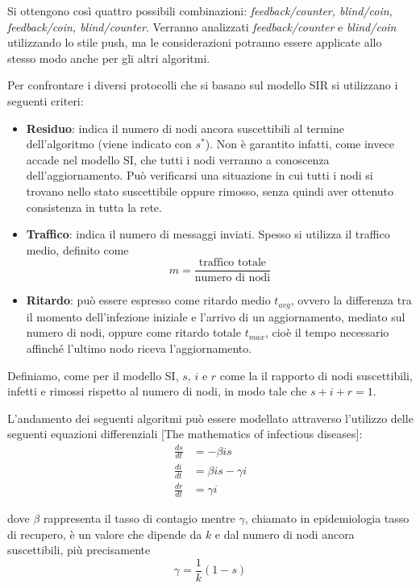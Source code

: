 Si ottengono così quattro possibili combinazioni: \textit{
feedback/counter, blind/coin, feedback/coin, blind/counter}.
Verranno analizzati \textit{feedback/counter} e \textit{blind/coin} utilizzando lo stile push, ma le considerazioni potranno essere applicate allo stesso modo anche per gli altri algoritmi.

Per confrontare i diversi protocolli che si basano sul modello SIR si utilizzano i seguenti criteri:
\begin{itemize}
    \item \textbf{Residuo}: indica il numero di nodi ancora suscettibili al termine dell’algoritmo (viene indicato con $s^*$). Non è garantito infatti, come invece accade nel modello SI, che tutti i nodi verranno a conoscenza dell’aggiornamento. Può verificarsi una situazione in cui tutti i nodi si trovano nello stato suscettibile oppure rimosso, senza quindi aver ottenuto consistenza in tutta la rete.
    \item \textbf{Traffico}: indica il numero di messaggi inviati. Spesso si utilizza il traffico medio, definito come
    \begin{equation}
        m = \frac{\textrm{traffico totale}}{\textrm{numero di nodi}}        
    \end{equation}
    \item \textbf{Ritardo}: può essere espresso come ritardo medio $t_{avg}$, ovvero la differenza tra il momento dell'infezione iniziale e l'arrivo di un aggiornamento, mediato sul numero di nodi, oppure come ritardo totale $t_{max}$, cioè il tempo necessario affinché l'ultimo nodo riceva l'aggiornamento.
\end{itemize}  
Definiamo, come per il modello SI, $s$, $i$ e $r$ come la il rapporto di nodi suscettibili, infetti e rimossi rispetto al numero di nodi, in modo tale che $s + i + r = 1$.

L’andamento dei seguenti algoritmi può essere modellato attraverso l’utilizzo delle seguenti equazioni differenziali [The mathematics of infectious diseases]:
\begin{equation}
    \begin{split}
        \frac{ds}{dt} & = - \beta is \\
    \frac{di}{dt} & = \beta is - \gamma i \\
    \frac{dr}{dt} & = \gamma i
    \end{split}
\end{equation}

dove $\beta$ rappresenta il tasso di contagio mentre $\gamma$, chiamato in epidemiologia tasso di recupero, è un valore che dipende da $k$ e dal numero di nodi ancora suscettibili, più precisamente
\begin{equation}
    \gamma = \frac{1}{k}(1-s)
\end{equation}


